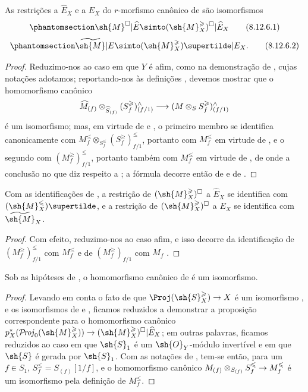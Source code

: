 \documentclass[oneside,10pt]{amsart}
\makeatletter
\renewcommand{\leq}{\leqslant}
\renewcommand{\geq}{\geqslant}
\newcommand{\ega@arrow}[2]{\mathchoice{#1}{#2}{#2}{#2}}
\renewcommand{\to}{\ega@arrow{\longrightarrow}{\rightarrow}}
\def\shProj{\mathcal{P}\!\mathit{roj}}
\newcommand{\oldpage}[2][]{\marginnote{\normalfont\footnotesize\textbf{#1}~|~#2}\ignorespaces}
\let\EGAOriginalLabel\label
\renewcommand{\label}[1]{\phantomsection\EGAOriginalLabel{#1}}
\makeatother
\begin{document}
\begin{proposition}[8.12.6]
\label{II.8.12.6}
As restrições a $\widehat{E}_X$ e a $E_X$ do $r$-morfismo canônico de  são isomorfismos
\[
\label{II.8.12.6.1}
  \sh{M}^\square|\widehat{E}\simto(\sh{M}_X^\geq)^\square|\widehat{E}_X
\tag{8.12.6.1}
\]
\[
\label{II.8.12.6.2}
  \widetilde{\sh{M}}|E\simto(\sh{M}_X^\geq)\supertilde|E_X.
\tag{8.12.6.2}
\]
\end{proposition}

\begin{proof}
Reduzimo-nos ao caso em que $Y$ é afim, como na demonstração de , cujas notações adotamos;
reportando-nos às definições , devemos mostrar que o homomorfismo canônico
\[
  \widehat{M}_{(f)}\otimes_{\widehat{S}_{(f)}}(S_f^\geq)_{(f/1)}^\wedge\to(M\otimes_S S_f^\geq)_{(f/1)}^\wedge
\]
é um isomorfismo;
mas, em virtude de  e , o primeiro membro se identifica canonicamente com $M_f^\leq\otimes_{S_f^\leq}(S_f^\geq)_{f/1}^\leq$, portanto com $M_f^\leq$ em virtude de , e o segundo com $(M_f^\geq)_{f/1}^\leq$, portanto também com $M_f^\leq$ em virtude de , de onde a conclusão no que diz respeito a ;
a fórmula  decorre então de  e de .
\end{proof}

\begin{corollary}[8.12.7]
\label{II.8.12.7}
Com as identificações de , a restrição de $(\sh{M}_X^\geq)^\square$ a $\widehat{E}_X$ se identifica com $(\sh{M}_X^\leq)\supertilde$, e a restrição de $(\sh{M}_X^\geq)^\square$ a $E_X$ se identifica com $\widetilde{\sh{M}}_X$.
\end{corollary}

\begin{proof}
Com efeito, reduzimo-nos ao caso afim, e isso decorre da identificação de $(M_f^\geq)_{f/1}^\leq$ com $M_f^\leq$ e de $(M_f^\geq)_{f/1}$ com $M_f$ .
\end{proof}

\begin{proposition}[8.12.8]
\label{II.8.12.8}
Sob as hipóteses de , o homomorfismo canônico de  é um isomorfismo.
\end{proposition}

\begin{proof}
Levando em conta o fato de que $\Proj(\sh{S}_X^\geq)\to X$ é um isomorfismo , e os
\oldpage[II]{195}
isomorfismos de  e , ficamos reduzidos a demonstrar a proposição correspondente para o homomorfismo canônico $p_X^*(\shProj_0(\sh{M}_X^\geq))\to(\sh{M}_X^\geq)^\square|\widehat{E}_X$; em outras palavras, ficamos reduzidos ao caso em que $\sh{S}_1$ é um $\sh{O}_Y$-módulo invertível e em que $\sh{S}$ é gerada por $\sh{S}_1$.
Com as notações de , tem-se então, para um $f\in S_1$, $S_f^\leq=S_{(f)}[1/f]$, e o homomorfismo canônico $M_{(f)}\otimes_{S_{(f)}}S_f^\leq\to M_f^\leq$ é um isomorfismo pela definição de $M_f^\leq$.
\end{proof}
\end{document}
